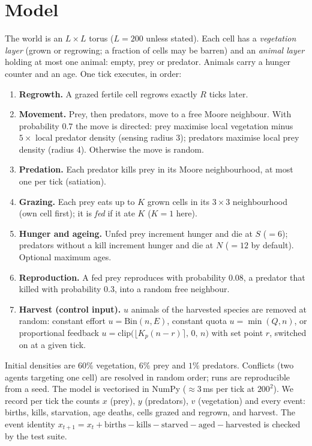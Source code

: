 \section{Model}
The world is an $L\times L$ torus ($L=200$ unless stated). Each cell has a \emph{vegetation layer}
(grown or regrowing; a fraction of cells may be barren) and an \emph{animal layer} holding at most one
animal: empty, prey or predator. Animals carry a hunger counter and an age. One tick executes, in order:
\begin{enumerate}[nosep,leftmargin=*]
  \item \textbf{Regrowth.} A grazed fertile cell regrows exactly $R$ ticks later.
  \item \textbf{Movement.} Prey, then predators, move to a free Moore neighbour. With probability $0.7$ the
        move is directed: prey maximise local vegetation minus $5\times$ local predator density
        (sensing radius 3); predators maximise local prey density (radius 4). Otherwise the move is random.
  \item \textbf{Predation.} Each predator kills prey in its Moore neighbourhood, at most one per tick
        (satiation).
  \item \textbf{Grazing.} Each prey eats up to $K$ grown cells in its $3\times3$ neighbourhood (own cell first);
        it is \emph{fed} if it ate $K$ ($K=1$ here).
  \item \textbf{Hunger and ageing.} Unfed prey increment hunger and die at $S$ ($=6$); predators without a kill
        increment hunger and die at $N$ ($=12$ by default). Optional maximum ages.
  \item \textbf{Reproduction.} A fed prey reproduces with probability $0.08$, a predator that killed with
        probability $0.3$, into a random free neighbour.
  \item \textbf{Harvest (control input).} $u$ animals of the harvested species are removed at random:
        constant effort $u=\mathrm{Bin}(n,E)$, constant quota $u=\min(Q,n)$, or proportional feedback
        $u=\mathrm{clip}\big(\lfloor K_p(n-r)\rceil,\,0,\,n\big)$ with set point $r$, switched on at a given tick.
\end{enumerate}
Initial densities are $60\%$ vegetation, $6\%$ prey and $1\%$ predators. Conflicts (two agents targeting one
cell) are resolved in random order; runs are reproducible from a seed. The model is vectorised in NumPy
($\approx\!3$\,ms per tick at $200^2$). We record per tick the counts $x$ (prey), $y$ (predators), $v$
(vegetation) and every event: births, kills, starvation, age deaths, cells grazed and regrown, and harvest.
The event identity $x_{t+1}=x_t+\text{births}-\text{kills}-\text{starved}-\text{aged}-\text{harvested}$ is
checked by the test suite.

